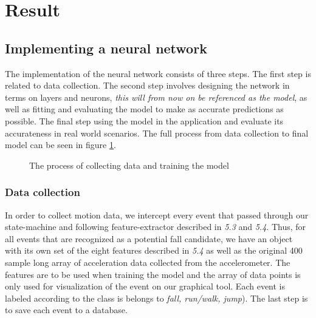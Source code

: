\documentclass[12pt, a4paper, onecolumn]{article}
\begin{document}
\section{Result}
		\subsection{Implementing a neural network}
			The implementation of the neural network consists of three steps. The first step is related to data collection. The second step involves designing the network in terms on layers and neurons, \textit{this will from now on be referenced as the model}, as well as fitting and evaluating the model to make as accurate predictions as possible. The final step using the model in the application and evaluate its accurateness in real world scenarios. The full process from data collection to final model can be seen in figure \ref{fig:training-model}.
			
			\begin{figure}[H]
				\centering
				\caption{The process of collecting data and training the model}%
				\label{fig:training-model}%
			\end{figure}
			
		\subsubsection{Data collection}
		In order to collect motion data, we intercept every event that passed through our state-machine and following feature-extractor described in \textit{5.3} and \textit{5.4}. Thus, for all events that are recognized as a potential fall candidate, we have an object with its own set of the eight features described in \textit{5.4} as well as the original 400 sample long array of acceleration data collected from the accelerometer. The features are to be used when training the model and the array of data points is only used for visualization of the event on our graphical tool. Each event is labeled according to the class is belongs to \textit{fall, run/walk, jump}). The last step is to save each event to a database. 
		
\end{document}
